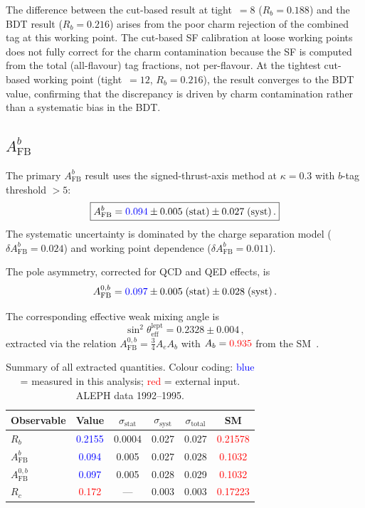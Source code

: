 \documentclass[11pt,a4paper]{article}
\newcommand{\measured}[1]{\textcolor{blue}{#1}}
\newcommand{\external}[1]{\textcolor{red}{#1}}
\begin{document}
The difference between the cut-based result at tight~$=8$ ($R_b = 0.188$)
and the BDT result ($R_b = 0.216$) arises from the poor charm rejection of
the combined tag at this working point.  The cut-based SF calibration at
loose working points does not fully correct for the charm contamination
because the SF is computed from the total (all-flavour) tag fractions, not
per-flavour.  At the tightest cut-based working point (tight~$=12$,
$R_b = 0.216$), the result converges to the BDT value, confirming that the
discrepancy is driven by charm contamination rather than a systematic bias
in the BDT.

\subsection{$A_\mathrm{FB}^b$}

The primary $A_\mathrm{FB}^b$ result uses the signed-thrust-axis method
at $\kappa = 0.3$ with $b$-tag threshold $> 5$:
\begin{equation}
\boxed{
  A_\mathrm{FB}^b = \measured{0.094} \pm 0.005\;\mathrm{(stat)} \pm
  0.027\;\mathrm{(syst)}\,.
}
\label{eq:afb-result}
\end{equation}
The systematic uncertainty is dominated by the charge separation model
($\delta A_\mathrm{FB}^b = 0.024$) and working point dependence
($\delta A_\mathrm{FB}^b = 0.011$).

The pole asymmetry, corrected for QCD and QED effects, is
\begin{equation}
  A_\mathrm{FB}^{0,b} = \measured{0.097} \pm 0.005\;\mathrm{(stat)}
    \pm 0.028\;\mathrm{(syst)}\,.
  \label{eq:afb0-result}
\end{equation}

The corresponding effective weak mixing angle is
\begin{equation}
  \sin^2\theta_\mathrm{eff}^\mathrm{lept} = 0.2328 \pm 0.004\,,
  \label{eq:sin2theta}
\end{equation}
extracted via the relation $A_\mathrm{FB}^{0,b} = \frac{3}{4} A_e A_b$
with $A_b = \external{0.935}$ from the SM~\cite{LEP:EWWG:2005}.

\begin{table}[htbp]
\centering
\caption{Summary of all extracted quantities.  Colour coding:
  \measured{blue} = measured in this analysis;
  \external{red} = external input.  ALEPH data 1992--1995.}
\label{tbl:all-results}
\begin{tabular}{lccccc}
\toprule
Observable & Value & $\sigma_\mathrm{stat}$ & $\sigma_\mathrm{syst}$ & $\sigma_\mathrm{total}$ & SM \\
\midrule
$R_b$ & \measured{0.2155} & 0.0004 & 0.027 & 0.027 & \external{0.21578} \\
$A_\mathrm{FB}^b$ & \measured{0.094} & 0.005 & 0.027 & 0.028 & \external{0.1032} \\
$A_\mathrm{FB}^{0,b}$ & \measured{0.097} & 0.005 & 0.028 & 0.029 & \external{0.1032} \\
$R_c$ & \external{0.172} & --- & 0.003 & 0.003 & \external{0.17223} \\
\bottomrule
\end{tabular}
\end{table}
\end{document}
